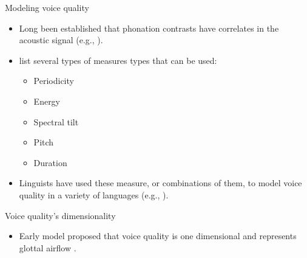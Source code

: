 \documentclass{beamer}
\begin{document}
\begin{frame}{Modeling voice quality}
  \begin{itemize}
    \item Long been established that phonation contrasts have correlates in the acoustic signal (e.g., \cite{fischer-jorgensenPhoneticAnalysisBreathy1968,klattAnalysisSynthesisPerception1990}).
    \item \citet{gordonPhonationTypesCrosslinguistic2001} list several types of measures types that can be used:
    \begin{itemize}
    \item Periodicity
    \item Energy
    \item Spectral tilt
    \item Pitch
    \item Duration 
    \end{itemize}
  \item Linguists have used these measure, or combinations of them, to model voice quality in a variety of languages (e.g., \cite{blankenshipTimingNonmodalPhonation2002,brunelleTonePhonationSoutheast2016,espositoAcousticElectroglottographicStudy2012}). 
  \end{itemize}
\end{frame}

\begin{frame}{Voice quality's dimensionality}
  \begin{itemize}
    \item Early model proposed that voice quality is one dimensional and represents glottal airflow \citep{ladefogedPreliminariesLinguisticPhonetics1971,ladefogedSoundsWorldsLanguages1996}.
  \end{itemize}
  \begin{figure}[h!]
\end{figure}
\end{frame}
\end{document}
